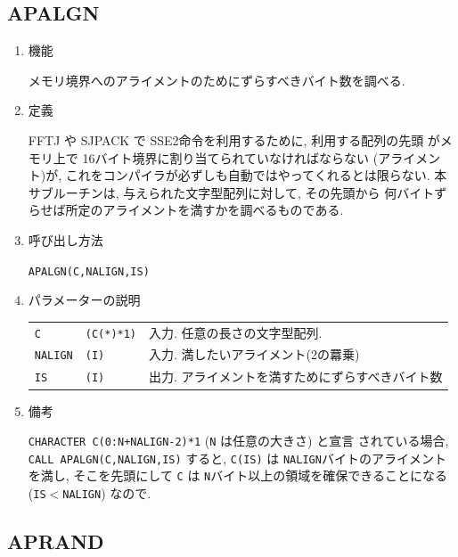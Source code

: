 \documentclass[a4j]{jarticle}
\begin{document}

\subsection{APALGN}

\begin{enumerate}

\item 機能 

メモリ境界へのアライメントのためにずらすべきバイト数を調べる.

\item 定義

FFTJ や SJPACK で SSE2命令を利用するために, 利用する配列の先頭
がメモリ上で 16バイト境界に割り当てられていなければならない
(アライメント)が,
これをコンパイラが必ずしも自動ではやってくれるとは限らない.
本サブルーチンは, 与えられた文字型配列に対して, その先頭から
何バイトずらせば所定のアライメントを満すかを調べるものである.

\item 呼び出し方法 
    
{\tt APALGN(C,NALIGN,IS)}
  
\item パラメーターの説明 
    
\begin{tabular}{lll}
{\tt C} & {\tt (C(*)*1)} & 入力. 任意の長さの文字型配列.\\
{\tt NALIGN} & {\tt (I)} & 入力. 満したいアライメント(2の羃乗)\\
{\tt IS} & {\tt (I)} & 出力. アライメントを満すためにずらすべきバイト数
\end{tabular}

\item 備考

{\tt CHARACTER C(0:N+NALIGN-2)*1} ({\tt N} は任意の大きさ) と宣言
されている場合, {\tt CALL APALGN(C,NALIGN,IS)} すると, {\tt C(IS)}
は {\tt NALIGN}バイトのアライメントを満し, そこを先頭にして {\tt C}
は {\tt N}バイト以上の領域を確保できることになる({\tt IS}$<${\tt NALIGN})
なので.

\end{enumerate}


\subsection{APRAND}
\end{document}
